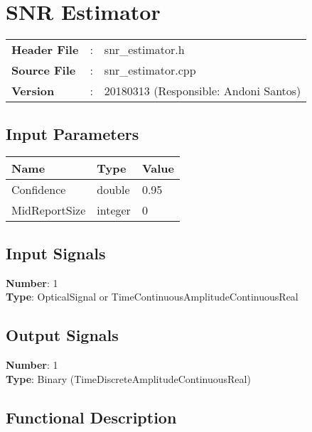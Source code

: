 \clearpage

\section{SNR Estimator}

\begin{tcolorbox}	
	\begin{tabular}{p{2.75cm} p{0.2cm} p{10.5cm}} 	
		\textbf{Header File}   &:& snr\_estimator.h \\
		\textbf{Source File}   &:& snr\_estimator.cpp \\
		\textbf{Version}	   &:& 20180313 (Responsible: Andoni Santos)
	\end{tabular}
\end{tcolorbox}

\subsection*{Input Parameters}

\begin{table}[H]
	\centering
	\begin{tabular}{|l|l|l|}
		\hline
		\textbf{Name}  & \textbf{Type}  & \textbf{Value}    \\ \hline
		Confidence     & double         & 0.95              \\ \hline
		MidReportSize  & integer        & 0                 \\ \hline
	\end{tabular}
\end{table}

\subsection*{Input Signals}

\textbf{Number}: 1\\
\textbf{Type}: OpticalSignal or TimeContinuousAmplitudeContinuousReal

\subsection*{Output Signals}

\textbf{Number}: 1\\
\textbf{Type}: Binary (TimeDiscreteAmplitudeContinuousReal)

\subsection*{Functional Description}


